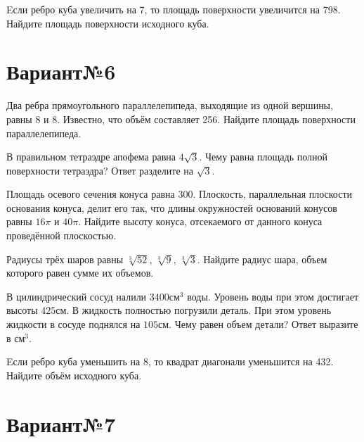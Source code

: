 \documentclass[4apaper]{article}
\begin{document}
\begin{taskBN}{6}
Eсли ребро куба увеличить на 7, то площадь поверхности увеличится на 798. Найдите площадь поверхности исходного куба.
\end{taskBN}
\newpage\section*{Вариант№6}

\begin{taskBN}{1}
Два ребра прямоугольного параллелепипеда, выходящие из одной вершины, равны 8 и 8. Известно, что объём составляет 256. Найдите площадь поверхности параллелепипеда.
\end{taskBN}

\begin{taskBN}{2}
В правильном тетраэдре апофема равна $4\sqrt{3}$. Чему равна площадь полной поверхности тетраэдра? Ответ разделите на $\sqrt{3}$.
\end{taskBN}

\begin{taskBN}{3}
Площадь осевого сечения конуса равна $300$. Плоскость, параллельная плоскости основания конуса,  делит его так, что длины окружностей оснований конусов равны $16\pi$ и $40\pi$. Найдите высоту конуса, отсекаемого от данного конуса проведённой плоскостью. 
\end{taskBN}

\begin{taskBN}{4}
Радиусы трёх шаров равны $\sqrt[3]{52}$, $\sqrt[3]{9}$, $\sqrt[3]{3}$. Найдите радиус шара, объем которого равен сумме их объемов.
\end{taskBN}

\begin{taskBN}{5}
В цилиндрический сосуд налили $3400\mbox{см}^3$ воды. Уровень воды при этом достигает высоты $425$см. В жидкость полностью погрузили деталь. При этом уровень жидкости в сосуде поднялся на $105$см. Чему равен объем детали? Ответ выразите в $\mbox{см}^3$.
\end{taskBN}

\begin{taskBN}{6}
Eсли ребро куба уменьшить на 8, то квадрат диагонали уменьшится на 432. Найдите объём исходного куба.
\end{taskBN}
\newpage\section*{Вариант№7}
\end{document}
